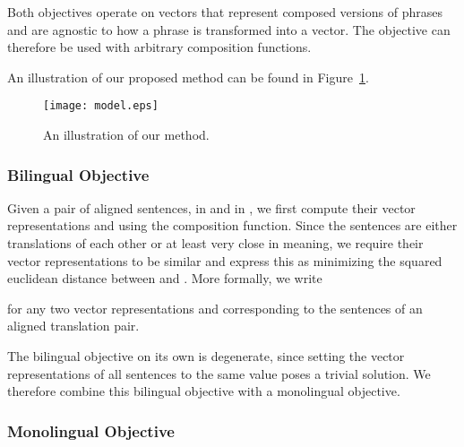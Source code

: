 \documentclass{article} \usepackage{iclr2015,times}
\begin{document}
Both objectives operate on vectors that represent composed versions
of phrases and are agnostic to how a phrase is transformed into a vector.
The objective can therefore be used with arbitrary composition functions.

An illustration of our proposed method can be found in 
Figure~\ref{fig:all-illustration}.

\begin{figure}[t]
    \begin{center}
        \texttt{[image: model.eps]}
    \end{center}
    \caption{An illustration of our method.}
    \label{fig:all-illustration}
\end{figure}

\subsubsection{Bilingual Objective}

Given a pair of aligned sentences,  in 
and  in , we first compute their vector representations
  and  using the composition function.
Since the sentences are either translations of each other or at least
very close in meaning, we require their vector representations to be similar
and express this as minimizing the squared euclidean
distance between  and .
More formally, we write

for any two vector representations  and  corresponding to
the sentences of an aligned translation pair.

The bilingual objective on its own is degenerate, since setting the vector
representations of all sentences to the same value poses a trivial solution.
We therefore combine this bilingual objective with a monolingual objective.

\subsubsection{Monolingual Objective}
\end{document}
